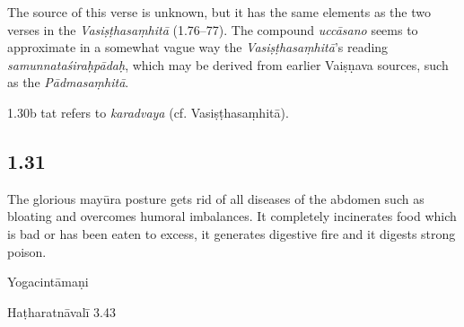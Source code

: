 \begin{ekdosis}
\begin{testimonia}[hp01_030]
\end{testimonia}

\begin{philcomm}[hp01_030]
The source of this verse is unknown, but it has the same elements as the two verses in the \emph{Vasiṣṭhasaṃhitā} (1.76–77). The compound \emph{uccāsano} seems to approximate in a somewhat vague way the \emph{Vasiṣṭhasaṃhitā}’s reading \emph{samunnataśiraḥpādaḥ}, which may be derived from earlier Vaiṣṇava sources, such as the \textit{Pādmasaṃhitā}. 
 

1.30b tat refers to \emph{karadvaya} (cf. Vasiṣṭhasaṃhitā).
\end{philcomm}

\subsection*{1.31}
\begin{translation}[hp01_031]
The glorious mayūra posture gets rid of all diseases of the abdomen such as bloating and overcomes humoral imbalances. It completely incinerates food which is bad or has been eaten to excess, it generates digestive fire and it digests strong poison.
\end{translation}

\begin{testimonia}[hp01_031]
Yogacintāmaṇi

\begin{versinnote}
\end{versinnote}

Haṭharatnāvalī 3.43

\begin{versinnote}
\end{versinnote}

\end{testimonia}


\end{ekdosis}
